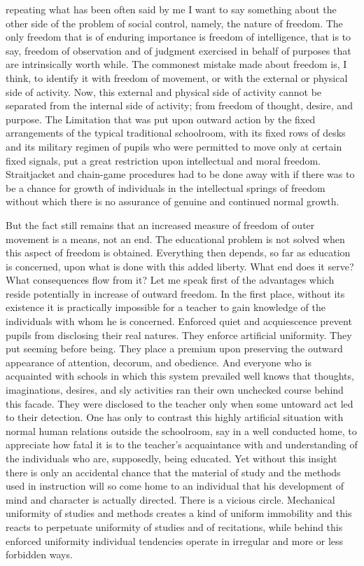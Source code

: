  repeating what has been often said by me I want to say something 
about the other side of the problem of social control, namely, the nature of freedom. The 
only freedom that is of enduring importance is freedom of intelligence, that is to say, 
freedom of observation and of judgment exercised in behalf of purposes that are 
intrinsically worth while. The commonest mistake made about freedom is, I think, to 
identify it with freedom of movement, or with the external or physical side of activity. 
Now, this external and physical side of activity cannot be separated from the internal side 
of activity; from freedom of thought, desire, and purpose. The Limitation that was put 
upon outward action by the fixed arrangements of the typical traditional schoolroom, 
with its fixed rows of desks and its military regimen of pupils who were permitted to 
move only at certain fixed signals, put a great restriction upon intellectual and moral 
freedom. Straitjacket and chain-game procedures had to be done away with if there was 
to be a chance for growth of individuals in the intellectual springs of freedom without 
which there is no assurance of genuine and continued normal growth. 

But the fact still remains that an increased measure of freedom of outer movement is a 
means, not an end. The educational problem is not solved when this aspect of freedom is 
obtained. Everything then depends, so far as education is concerned, upon what is done 
with this added liberty. What end does it serve? What consequences flow from it? Let me 
speak first of the advantages which reside potentially in increase of outward freedom. In 
the first place, without its existence it is practically impossible for a teacher to gain 
knowledge of the individuals with whom he is concerned. Enforced quiet and 
acquiescence prevent pupils from disclosing their real natures. They enforce artificial 
uniformity. They put seeming before being. They place a premium upon preserving the 
outward appearance of attention, decorum, and obedience. And everyone who is 
acquainted with schools in which this system prevailed well knows that thoughts, 
imaginations, desires, and sly activities ran their own unchecked course behind this 
facade. They were disclosed to the teacher only when some untoward act led to their 
detection. One has only to contrast this highly artificial situation with normal human 
relations outside the schoolroom, say in a well conducted home, to appreciate how fatal it 
is to the teacher's acquaintance with and understanding of the individuals who are, 
supposedly, being educated. Yet without this insight there is only an accidental chance 
that the material of study and the methods used in instruction will so come home to an individual that his development of mind and character is actually directed. There is a 
vicious circle. Mechanical uniformity of studies and methods creates a kind of uniform 
immobility and this reacts to perpetuate uniformity of studies and of recitations, while 
behind this enforced uniformity individual tendencies operate in irregular and more or 
less forbidden ways. 


